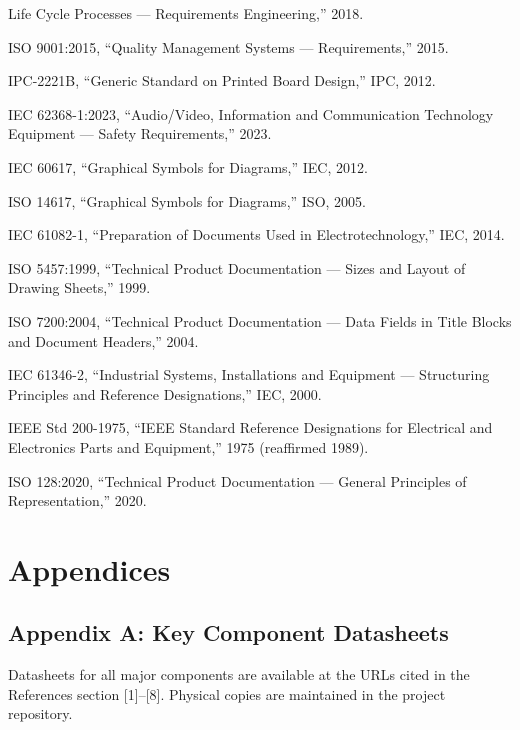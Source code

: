\documentclass[12pt,a4paper]{article}
\begin{document}
\begin{enumerate}[label={[\arabic*]}, leftmargin=*]
      Life Cycle Processes --- Requirements Engineering,'' 2018.
\item ISO 9001:2015, ``Quality Management Systems --- Requirements,''
      2015.
\item IPC-2221B, ``Generic Standard on Printed Board Design,'' IPC,
      2012.
\item IEC 62368-1:2023, ``Audio/Video, Information and Communication
      Technology Equipment --- Safety Requirements,'' 2023.
\item IEC 60617, ``Graphical Symbols for Diagrams,'' IEC, 2012.
\item ISO 14617, ``Graphical Symbols for Diagrams,'' ISO, 2005.
\item IEC 61082-1, ``Preparation of Documents Used in
      Electrotechnology,'' IEC, 2014.
\item ISO 5457:1999, ``Technical Product Documentation --- Sizes and
      Layout of Drawing Sheets,'' 1999.
\item ISO 7200:2004, ``Technical Product Documentation --- Data Fields
      in Title Blocks and Document Headers,'' 2004.
\item IEC 61346-2, ``Industrial Systems, Installations and Equipment
      --- Structuring Principles and Reference Designations,'' IEC,
      2000.
\item IEEE Std 200-1975, ``IEEE Standard Reference Designations for
      Electrical and Electronics Parts and Equipment,'' 1975
      (reaffirmed 1989).
\item ISO 128:2020, ``Technical Product Documentation --- General
      Principles of Representation,'' 2020.
\end{enumerate}

\newpage
\appendix
\section*{Appendices}

\subsection*{Appendix A: Key Component Datasheets}

Datasheets for all major components are available at the URLs cited in
the References section [1]--[8]. Physical copies are maintained in the
project repository.
\end{document}

